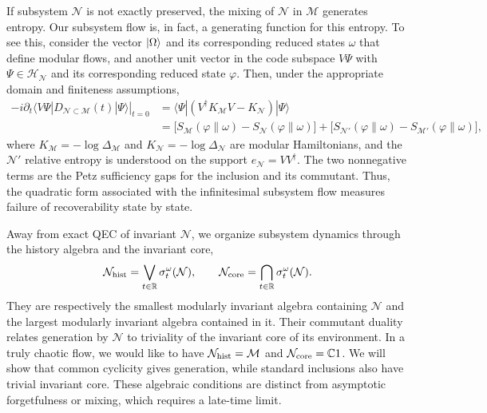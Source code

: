 \documentclass[a4paper,11pt]{article}
\theoremstyle{definition}
\newcommand{\mN}{\mathcal{N}}
\newcommand{\mH}{\mathcal{H}}
\newcommand{\mM}{\mathcal{M}}
\begin{document}
If subsystem $\mN$ is not exactly preserved, the mixing of $\mN$ in $\mM$ generates entropy. Our subsystem flow is, in fact, a generating function for this entropy. To see this, consider the vector $\ket{\Omega}$ and its corresponding reduced states $\omega$ that define modular flows, and another unit vector in the code subspace $V\Psi$ with $\Psi\in\mH_{\mN}$ and its corresponding reduced state $\varphi$. Then, under the appropriate domain and finiteness assumptions,
\begin{align}
 -i\left.
 \partial_t
 \langle V\Psi|D_{\mN\subset\mM}(t)|\Psi\rangle
 \right|_{t=0}
 &=
 \langle\Psi|(V^\dagger K_{\mM}V-K_{\mN})|\Psi\rangle
 \nonumber\\
 &=
 \bigl[
 S_{\mM}(\varphi\|\omega)-S_{\mN}(\varphi\|\omega)
 \bigr]
 +
 \bigl[
 S_{\mN'}(\varphi\|\omega)-S_{\mM'}(\varphi\|\omega)
 \bigr],
 \label{eq:intro-entropy}
\end{align}
where $K_{\mM}=-\log\Delta_{\mM}$ and $K_{\mN}=-\log\Delta_{\mN}$ are modular Hamiltonians, and
 the $\mN'$ relative entropy is understood on the support $e_{\mN}=VV^\dagger$. The two nonnegative terms are the Petz sufficiency gaps for the inclusion and its commutant. Thus, the quadratic form associated with the infinitesimal subsystem flow measures failure of recoverability state by state.

Away from exact QEC of invariant $\mN$, we organize subsystem dynamics through the history algebra and the invariant core,
\begin{equation}
    \mN_{\rm hist}
    =
    \bigvee_{t\in\mathbb R}\sigma_t^\omega(\mN),
    \qquad
    \mN_{\rm core}
    =
    \bigcap_{t\in\mathbb R}\sigma_t^\omega(\mN).
\end{equation}
They are respectively the smallest modularly invariant algebra containing $\mN$ and the largest modularly invariant algebra contained in it. Their commutant duality relates generation by $\mN$ to triviality of the invariant core of its environment. In a truly chaotic flow, we would like to have $\mN_{\rm hist}=\mM$ and $\mN_{\rm core}=\mathbb C1$. We will show that common cyclicity gives generation, while standard inclusions also have trivial invariant core. These algebraic conditions are distinct from asymptotic forgetfulness or mixing, which requires a late-time limit.
\end{document}
